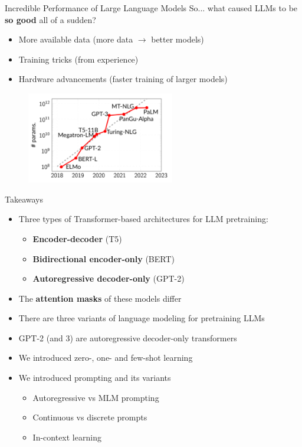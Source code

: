 \documentclass[12pt,aspectratio=169,handout]{beamer}
\begin{document}
\begin{frame}{Incredible Performance of Large Language Models}
	So... what caused LLMs to be \textbf{so good} all of a sudden?
	\pause
	\begin{itemize}
		\item More available data (more data $\to$ better models)
		\pause
		\item Training tricks (from experience)
		\pause
		\item Hardware advancements (faster training of larger models)
	\end{itemize}
	\begin{figure}[h]
		\includegraphics[height=4cm]{lm-scaling}
	\end{figure}
\end{frame}

\begin{frame}{Takeaways}
	
\begin{itemize}
	\item Three types of Transformer-based architectures for LLM pretraining:
	\begin{itemize}
		\item \textbf{Encoder-decoder} (T5)
		\item \textbf{Bidirectional encoder-only} (BERT)
		\item \textbf{Autoregressive decoder-only} (GPT-2)
	\end{itemize}
	\item The \textbf{attention masks} of these models differ
	\item There are three variants of language modeling for pretraining LLMs
	\item GPT-2 (and 3) are autoregressive decoder-only transformers
	\item We introduced zero-, one- and few-shot learning
	\item We introduced prompting and its variants
	\begin{itemize}
		\item Autoregressive vs MLM prompting
		\item Continuous vs discrete prompts
		\item In-context learning
	\end{itemize}
\end{itemize}
	
\end{frame}
\end{document}
